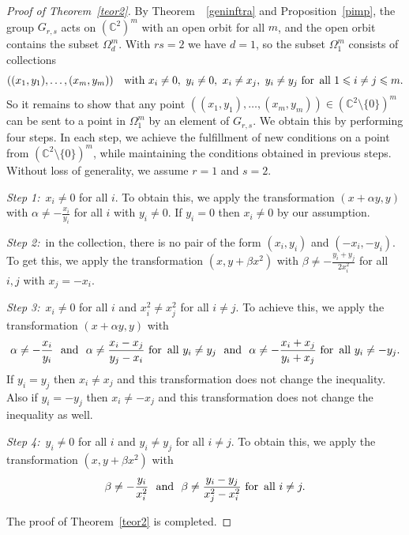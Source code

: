 \documentclass[a4paper,draft,reqno,12pt]{amsart}
\theoremstyle{definition}
\theoremstyle{remark}
\def\CC{{\mathbb C}}
\renewcommand{\le}{\leqslant}
\begin{document}
\begin{proof}[Proof of Theorem~\ref{teor2}]
By Theorem~~\ref{geninftra} and Proposition~\ref{pimp}, the group $G_{r,s}$ acts on $(\CC^2)^m$ with an open orbit for all $m$, and the open orbit contains the subset $\Omega^m_d$. 
With $rs=2$ we have $d=1$, so the subset $\Omega^m_1$ consists of collections
$$
((x_1,y_1), \ldots, (x_m,y_m)) \quad \text{with} \ x_i\ne 0, \ y_i\ne 0, \ x_i\ne x_j, \ y_i\ne y_j \ \text{for\, all} \ 1\le i\ne j\le m. 
$$
So it remains to show that any point $((x_1,y_1), \ldots, (x_m,y_m))\in(\CC^2\setminus\{0\})^m$ can be sent to a point in $\Omega^m_1$ by an element of $G_{r,s}$. 
We obtain this by performing four steps. In each step, we achieve the fulfillment of new conditions on a point from $(\CC^2\setminus\{0\})^m$, while maintaining the conditions obtained in previous steps. Without loss of generality, we assume $r=1$ and $s=2$. 

\smallskip 

{\it Step 1:}\ $x_i\ne 0$ for all $i$. To obtain this, we apply the transformation $(x+\alpha y, y)$ with $\alpha\ne -\frac{x_i}{y_i}$ for all $i$ with $y_i\ne 0$. If $y_i=0$ then $x_i\ne 0$ by our assumption.  

\smallskip 

{\it Step 2:}\ in the collection, there is no pair of the form $(x_i,y_i)$ and $(-x_i,-y_i)$. To get this, we apply the transformation $(x, y+\beta x^2)$ with $\beta\ne -\frac{y_i+y_j}{2x_i^2}$ for all $i, j$ with $x_j=-x_i$. 

\smallskip 

{\it Step 3:}\ $x_i\ne 0$ for all $i$ and $x_i^2\ne x_j^2$ for all $i\ne j$. To achieve this, we apply the transformation $(x+\alpha y, y)$ with 
$$
\alpha\ne -\frac{x_i}{y_i}  \ \ \text{and} \ \ \alpha\ne\frac{x_i-x_j}{y_j-x_i} \ \text{for\, all} \ y_i\ne y_j \ \ \text{and} \ \ \alpha\ne -\frac{x_i+x_j}{y_i+x_j} \ \text{for\, all} \ y_i\ne -y_j.
$$
If  $y_i=y_j$ then $x_i\ne x_j$ and this transformation does not change the inequality. Also if $y_i=-y_j$ then $ x_i\ne -x_j$ and this transformation does not change the inequality as well. 

\smallskip 

{\it Step 4:}\ $y_i\ne 0$ for all $i$ and $y_i\ne y_j$ for all $i\ne j$. To obtain this, we apply the transformation $(x, y+\beta x^2)$ with
$$
\beta\ne -\frac{y_i}{x_i^2}  \ \ \text{and} \ \ \beta\ne\frac{y_i-y_j}{x_j^2-x_i^2}  \ \text{for\, all} \ i\ne j.
$$
\smallskip

The proof of Theorem~\ref{teor2} is completed. 
\end{proof}
\end{document}
